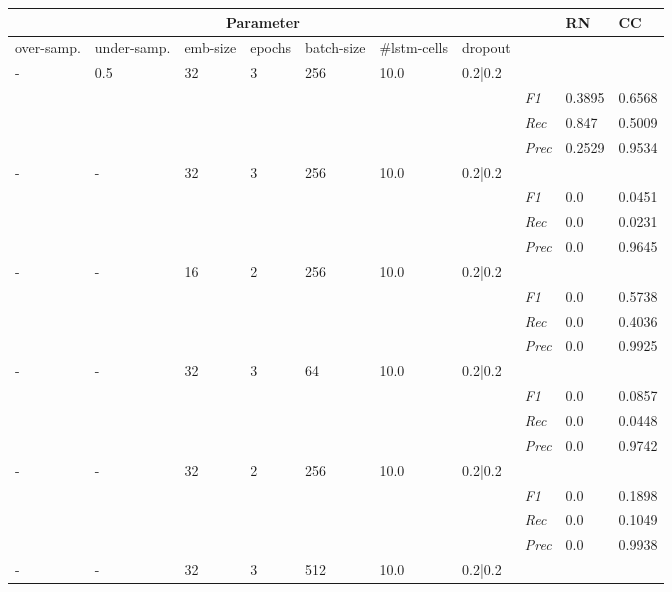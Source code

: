     \begin{table}[]
    \tiny
    \tabcolsep=0.11cm
    \begin{tabularx}{\textwidth}{XXXXXXX|X|X|X}
    \toprule
    \multicolumn{7}{c}{Parameter} & & RN & CC \\ \midrule
    over-\newline samp. & under-\newline samp. & emb-\newline size & epochs &batch-\newline size & \#lstm-\newline cells & dropout & & & \\ \midrule
    - & 0.5 & 32 & 3 & 256 &10.0 & 0.2|0.2 & & & \\
    & & & & & & & \textit{F1} & 0.3895 & 0.6568        \\
    & & & & & & & \textit{Rec} &  0.847 & 0.5009    \\
    & & & & & & & \textit{Prec} & 0.2529 & 0.9534  \\ \midrule
    - & - & 32 & 3 & 256 &10.0 & 0.2|0.2 & & & \\
    & & & & & & & \textit{F1} & 0.0 & 0.0451        \\
    & & & & & & & \textit{Rec} &  0.0 & 0.0231    \\
    & & & & & & & \textit{Prec} & 0.0 & 0.9645  \\ \midrule
    - & - & 16 & 2 & 256 &10.0 & 0.2|0.2 & & & \\
    & & & & & & & \textit{F1} & 0.0 & 0.5738        \\
    & & & & & & & \textit{Rec} &  0.0 & 0.4036    \\
    & & & & & & & \textit{Prec} & 0.0 & 0.9925  \\ \midrule
    - & - & 32 & 3 & 64 &10.0 & 0.2|0.2 & & & \\
    & & & & & & & \textit{F1} & 0.0 & 0.0857        \\
    & & & & & & & \textit{Rec} &  0.0 & 0.0448    \\
    & & & & & & & \textit{Prec} & 0.0 & 0.9742  \\ \midrule
    - & - & 32 & 2 & 256 &10.0 & 0.2|0.2 & & & \\
    & & & & & & & \textit{F1} & 0.0 & 0.1898        \\
    & & & & & & & \textit{Rec} &  0.0 & 0.1049    \\
    & & & & & & & \textit{Prec} & 0.0 & 0.9938  \\ \midrule
    - & - & 32 & 3 & 512 &10.0 & 0.2|0.2 & & & \\

\end{tabularx}
\end{table}
